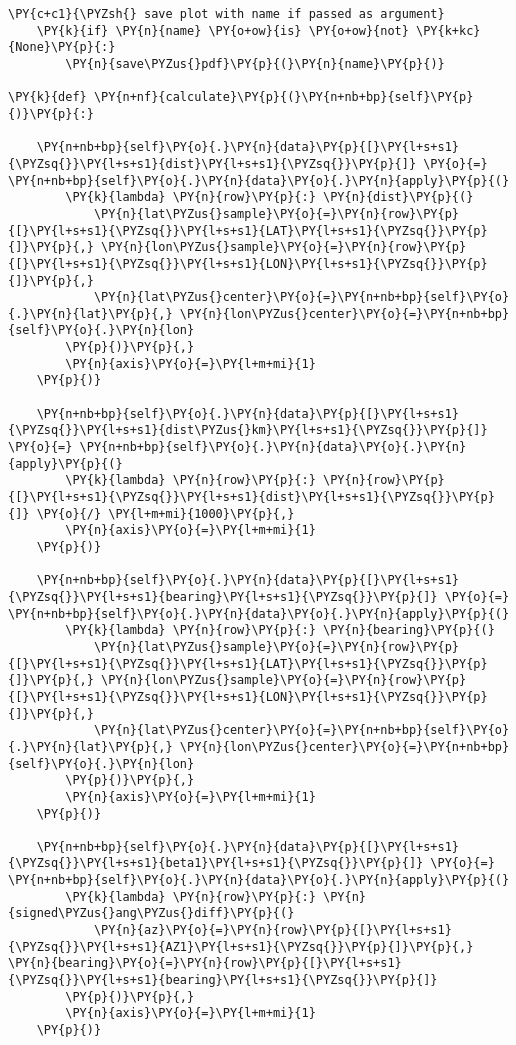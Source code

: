 \begin{tcolorbox}[breakable, size=fbox, boxrule=1pt, pad at break*=1mm,colback=cellbackground, colframe=cellborder]
\begin{Verbatim}[commandchars=\\\{\}]
    \PY{c+c1}{\PYZsh{} save plot with name if passed as argument}
    \PY{k}{if} \PY{n}{name} \PY{o+ow}{is} \PY{o+ow}{not} \PY{k+kc}{None}\PY{p}{:}
        \PY{n}{save\PYZus{}pdf}\PY{p}{(}\PY{n}{name}\PY{p}{)}

\PY{k}{def} \PY{n+nf}{calculate}\PY{p}{(}\PY{n+nb+bp}{self}\PY{p}{)}\PY{p}{:}

    \PY{n+nb+bp}{self}\PY{o}{.}\PY{n}{data}\PY{p}{[}\PY{l+s+s1}{\PYZsq{}}\PY{l+s+s1}{dist}\PY{l+s+s1}{\PYZsq{}}\PY{p}{]} \PY{o}{=} \PY{n+nb+bp}{self}\PY{o}{.}\PY{n}{data}\PY{o}{.}\PY{n}{apply}\PY{p}{(}
        \PY{k}{lambda} \PY{n}{row}\PY{p}{:} \PY{n}{dist}\PY{p}{(}
            \PY{n}{lat\PYZus{}sample}\PY{o}{=}\PY{n}{row}\PY{p}{[}\PY{l+s+s1}{\PYZsq{}}\PY{l+s+s1}{LAT}\PY{l+s+s1}{\PYZsq{}}\PY{p}{]}\PY{p}{,} \PY{n}{lon\PYZus{}sample}\PY{o}{=}\PY{n}{row}\PY{p}{[}\PY{l+s+s1}{\PYZsq{}}\PY{l+s+s1}{LON}\PY{l+s+s1}{\PYZsq{}}\PY{p}{]}\PY{p}{,}
            \PY{n}{lat\PYZus{}center}\PY{o}{=}\PY{n+nb+bp}{self}\PY{o}{.}\PY{n}{lat}\PY{p}{,} \PY{n}{lon\PYZus{}center}\PY{o}{=}\PY{n+nb+bp}{self}\PY{o}{.}\PY{n}{lon}
        \PY{p}{)}\PY{p}{,}
        \PY{n}{axis}\PY{o}{=}\PY{l+m+mi}{1}
    \PY{p}{)}

    \PY{n+nb+bp}{self}\PY{o}{.}\PY{n}{data}\PY{p}{[}\PY{l+s+s1}{\PYZsq{}}\PY{l+s+s1}{dist\PYZus{}km}\PY{l+s+s1}{\PYZsq{}}\PY{p}{]} \PY{o}{=} \PY{n+nb+bp}{self}\PY{o}{.}\PY{n}{data}\PY{o}{.}\PY{n}{apply}\PY{p}{(}
        \PY{k}{lambda} \PY{n}{row}\PY{p}{:} \PY{n}{row}\PY{p}{[}\PY{l+s+s1}{\PYZsq{}}\PY{l+s+s1}{dist}\PY{l+s+s1}{\PYZsq{}}\PY{p}{]} \PY{o}{/} \PY{l+m+mi}{1000}\PY{p}{,}
        \PY{n}{axis}\PY{o}{=}\PY{l+m+mi}{1}
    \PY{p}{)}

    \PY{n+nb+bp}{self}\PY{o}{.}\PY{n}{data}\PY{p}{[}\PY{l+s+s1}{\PYZsq{}}\PY{l+s+s1}{bearing}\PY{l+s+s1}{\PYZsq{}}\PY{p}{]} \PY{o}{=} \PY{n+nb+bp}{self}\PY{o}{.}\PY{n}{data}\PY{o}{.}\PY{n}{apply}\PY{p}{(}
        \PY{k}{lambda} \PY{n}{row}\PY{p}{:} \PY{n}{bearing}\PY{p}{(}
            \PY{n}{lat\PYZus{}sample}\PY{o}{=}\PY{n}{row}\PY{p}{[}\PY{l+s+s1}{\PYZsq{}}\PY{l+s+s1}{LAT}\PY{l+s+s1}{\PYZsq{}}\PY{p}{]}\PY{p}{,} \PY{n}{lon\PYZus{}sample}\PY{o}{=}\PY{n}{row}\PY{p}{[}\PY{l+s+s1}{\PYZsq{}}\PY{l+s+s1}{LON}\PY{l+s+s1}{\PYZsq{}}\PY{p}{]}\PY{p}{,}
            \PY{n}{lat\PYZus{}center}\PY{o}{=}\PY{n+nb+bp}{self}\PY{o}{.}\PY{n}{lat}\PY{p}{,} \PY{n}{lon\PYZus{}center}\PY{o}{=}\PY{n+nb+bp}{self}\PY{o}{.}\PY{n}{lon}
        \PY{p}{)}\PY{p}{,}
        \PY{n}{axis}\PY{o}{=}\PY{l+m+mi}{1}
    \PY{p}{)}

    \PY{n+nb+bp}{self}\PY{o}{.}\PY{n}{data}\PY{p}{[}\PY{l+s+s1}{\PYZsq{}}\PY{l+s+s1}{beta1}\PY{l+s+s1}{\PYZsq{}}\PY{p}{]} \PY{o}{=} \PY{n+nb+bp}{self}\PY{o}{.}\PY{n}{data}\PY{o}{.}\PY{n}{apply}\PY{p}{(}
        \PY{k}{lambda} \PY{n}{row}\PY{p}{:} \PY{n}{signed\PYZus{}ang\PYZus{}diff}\PY{p}{(}
            \PY{n}{az}\PY{o}{=}\PY{n}{row}\PY{p}{[}\PY{l+s+s1}{\PYZsq{}}\PY{l+s+s1}{AZ1}\PY{l+s+s1}{\PYZsq{}}\PY{p}{]}\PY{p}{,} \PY{n}{bearing}\PY{o}{=}\PY{n}{row}\PY{p}{[}\PY{l+s+s1}{\PYZsq{}}\PY{l+s+s1}{bearing}\PY{l+s+s1}{\PYZsq{}}\PY{p}{]}
        \PY{p}{)}\PY{p}{,}
        \PY{n}{axis}\PY{o}{=}\PY{l+m+mi}{1}
    \PY{p}{)}


\end{Verbatim}
\end{tcolorbox}
